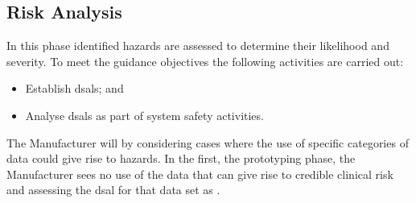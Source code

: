 \subsection{Risk Analysis}
\begin{minipage}[t]{0.73\textwidth}
  In this phase identified hazards are assessed to determine their likelihood and severity. To meet the guidance objectives the following activities are carried out:
  \begin{itemize}
    \item Establish \glspl{dsal}; and
    \item Analyse \glspl{dsal} as part of system safety activities.
  \end{itemize}
\end{minipage}
\begin{minipage}[t]{0.25\textwidth}
  \centering{}
\end{minipage}

The Manufacturer will  by considering cases where the use of specific categories of data could give rise to hazards. In the first, the prototyping phase, the Manufacturer sees no use of the data that can give rise to credible clinical risk and assessing the \gls{dsal} for that data set as . 


